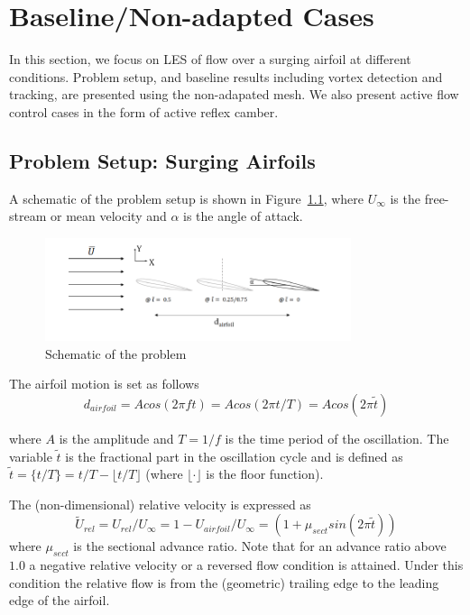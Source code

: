 \chapter{Baseline/Non-adapted Cases}
\label{chapter:baseline_results}

In this section, we focus on LES of flow over a surging airfoil at different conditions. Problem setup, and baseline results including vortex detection and tracking, are presented using the non-adapated mesh. We also present active flow control cases in the form of active reflex camber. 

\label{sec:baseline_results}

\section{Problem Setup: Surging Airfoils}
\label{sec:problem_setup_baseline}

A schematic of the problem setup is shown in Figure~\ref{fig:SetUpSketch}, where $U_\infty$ is the free-stream or mean velocity and $\alpha$ is the angle of attack.

\begin{figure}[H]
\centering
\includegraphics[width=0.8\textwidth]{figures/Setup/Setup.png}
\caption{Schematic of the problem}
\label{fig:SetUpSketch}
\end{figure}

The airfoil motion is set as follows
\begin{equation}
\label{eq:displacement}
  d_{airfoil} = A cos(2\pi f t) =  Acos(2\pi t/T) = Acos(2\pi\tilde{t})
\end{equation}

\noindent where $A$ is the amplitude and $T=1/f$ is the time period of the oscillation.
The variable $\tilde{t}$ is the fractional part in the oscillation cycle and is defined as $\tilde{t}=\{t/T\} = t/T - \lfloor t/T \rfloor$ (where $\lfloor \cdot \rfloor$ is the floor function).

The (non-dimensional) relative velocity is expressed as
\begin{equation}
\label{eq:relVelocity}
  \tilde{U}_{rel} = U_{rel}/U_\infty = 1 - U_{airfoil}/U_\infty = (1+\mu_{sect} sin(2\pi\tilde{t}))
\end{equation}
\noindent where $\mu_{sect}$ is the sectional advance ratio.
Note that for an advance ratio above $1.0$ a negative relative velocity or a reversed flow condition is attained.
Under this condition the relative flow is from the (geometric) trailing edge to the leading edge of the airfoil.

